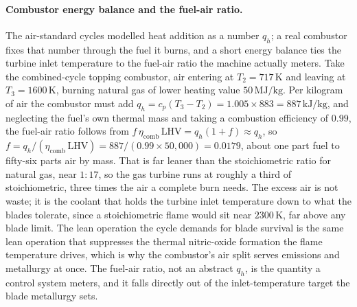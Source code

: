 \paragraph{Combustor energy balance and the fuel-air ratio.} The air-standard
cycles modelled heat addition as a number $q_h$; a real combustor fixes that number
through the fuel it burns, and a short energy balance ties the turbine inlet
temperature to the fuel-air ratio the machine actually meters. Take the
combined-cycle topping combustor, air entering at $T_2 = 717\,\si{\kelvin}$ and
leaving at $T_3 = 1600\,\si{\kelvin}$, burning natural gas of lower heating value
$50\,\text{MJ}/\text{kg}$. Per kilogram of air the combustor must add $q_h =
c_p(T_3 - T_2) = 1.005 \times 883 = 887\,\text{kJ}/\text{kg}$, and neglecting the
fuel's own thermal mass and taking a combustion efficiency of $0.99$, the
fuel-air ratio follows from $f\,\eta_{\text{comb}}\,\text{LHV} = q_h(1 + f)
\approx q_h$, so $f = q_h/(\eta_{\text{comb}}\,\text{LHV}) = 887/(0.99 \times
50{,}000) = 0.0179$, about one part fuel to fifty-six parts air by mass. That is far
leaner than the stoichiometric ratio for natural gas, near $1{:}17$, so the gas
turbine runs at roughly a third of stoichiometric, three times the air a complete
burn needs. The excess air is not waste; it is the coolant that holds the turbine
inlet temperature down to what the blades tolerate, since a stoichiometric flame
would sit near $2300\,\si{\kelvin}$, far above any blade limit. The lean operation
the cycle demands for blade survival is the same lean operation that suppresses the
thermal nitric-oxide formation the flame temperature drives, which is why the
combustor's air split serves emissions and metallurgy at once. The fuel-air ratio,
not an abstract $q_h$, is the quantity a control system meters, and it falls
directly out of the inlet-temperature target the blade metallurgy sets.

